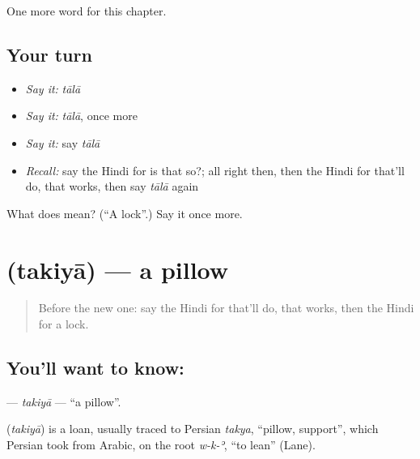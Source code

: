 \begin{grammarlens}[title={What you've built}]
One more word for this chapter.
\end{grammarlens}

\subsection*{Your turn}
\begin{itemize}
\raggedright
  \item \emph{Say it:} \emph{tālā}
  \item \emph{Say it:} \emph{tālā}, once more
  \item \emph{Say it:} say \emph{tālā}
  \item \emph{Recall:} say the Hindi for is that so?; all right then, then the Hindi for that'll do, that works, then say \emph{tālā} again
\end{itemize}

\begin{tcolorbox}[breakable,colback=teal!4,colframe=teal!35!black,title={Before you move on}]
What does  mean? (\textquotedblleft{}A lock\textquotedblright{}.) Say it once more.
\end{tcolorbox}
\section[\texorpdfstring{\hi{तकिया} (takiyā)}{तकिया (takiyā)}]{ (takiyā) — a pillow}

\label{lesson:HI-C129-takiya}



\begin{quote}
Before the new one: say the Hindi for that'll do, that works, then the Hindi for a lock.
\end{quote}

\subsection*{You'll want to know: }
\textbf{} — \emph{takiyā} — \textquotedblleft{}a pillow\textquotedblright{}.

\begin{cousinweb}
\textbf{} (\emph{takiyā}) is a loan, usually traced to Persian \emph{takya}, \textquotedblleft{}pillow, support\textquotedblright{}, which Persian took from Arabic, on the root \emph{w-k-ʾ}, \textquotedblleft{}to lean\textquotedblright{} (Lane).
\end{cousinweb}

